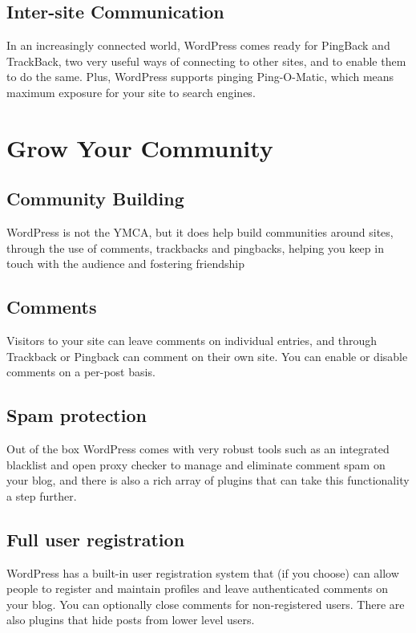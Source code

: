 \subsection{Inter-site Communication}

In an increasingly connected world, WordPress comes ready for PingBack and TrackBack, two very useful ways of connecting to other sites, and to enable them to do the same. Plus, WordPress supports pinging Ping-O-Matic, which means maximum exposure for your site to search engines.

\section{Grow Your Community}

\subsection{Community Building}
 
WordPress is not the YMCA, but it does help build communities around sites, through the use of comments, trackbacks and pingbacks, helping you keep in touch with the audience and fostering friendship

\subsection{Comments}

Visitors to your site can leave comments on individual entries, and through Trackback or Pingback can comment on their own site. You can enable or disable comments on a per-post basis.

\subsection{Spam protection}

Out of the box WordPress comes with very robust tools such as an integrated blacklist and open proxy checker to manage and eliminate comment spam on your blog, and there is also a rich array of plugins that can take this functionality a step further.

\subsection{Full user registration}

WordPress has a built-in user registration system that (if you choose) can allow people to register and maintain profiles and leave authenticated comments on your blog. You can optionally close comments for non-registered users. There are also plugins that hide posts from lower level users.

